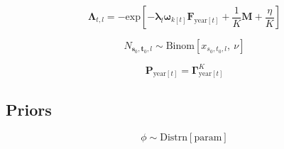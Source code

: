\documentclass{article}
\begin{document}

\begin{equation}
  \label{eq:model-survival}
    \boldsymbol{\Lambda}_{t,l} = 
    - \mathrm{exp} \! \left[ -
    \boldsymbol{\lambda}_{l} \boldsymbol{\omega}_{k[t]}  
    \boldsymbol{F}_{\mathrm{year}[t]} + \frac{1}{K} \boldsymbol{M} + \frac{\eta}{K} \right]
\end{equation}


\begin{equation}
  \label{eq:model-release}
  N_{\boldsymbol{s}_{0},\boldsymbol{t}_{0},l} \sim 
    \mathrm{Binom} \! \left[ x_{s_{0},t_{0},l} \mathrm{,} \: \nu \right]
\end{equation}

\begin{equation}
  \label{eq:model-movement}
  \boldsymbol{P}_{\mathrm{year}[t]} = \boldsymbol{\Gamma}^{K}_{\mathrm{year}[t]}
\end{equation}



\subsection{Priors}

\begin{equation}
  \label{eq:prior-dispersion}
  \phi \sim \mathrm{Distrn} \! \left[ \mathrm{param} \right]
\end{equation}
\end{document}
